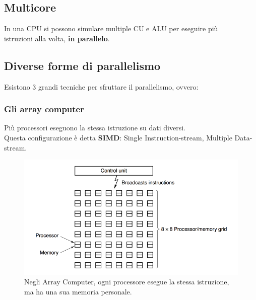\documentclass[12pt]{article}
\begin{document}
\subsection{Multicore}
In una CPU si possono simulare multiple CU e ALU per eseguire più\\
istruzioni alla volta, \textbf{in parallelo}.
\pagebreak
\subsection{Diverse forme di parallelismo}
Esistono 3 grandi tecniche per sfruttare il parallelismo, ovvero:
\subsubsection{Gli array computer}
Più processori eseguono la stessa istruzione su dati diversi.\\
Questa configurazione è detta \textbf{SIMD}: Single Instruction-stream, Multiple Data-stream.
\begin{figure}[!htb]
    \centering
    \includegraphics[width=1\textwidth, height=.7\textheight,keepaspectratio]{organizzazione_elab/array_computer.png} %
    \begin{center}
        \caption{\label{fig:array_computer}Negli Array Computer, ogni processore esegue la stessa istruzione, ma ha una sua memoria personale.} %
    \end{center}
\end{figure}
\pagebreak
\end{document}
